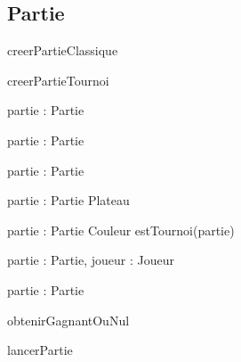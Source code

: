\subsection{Partie}

\begin{algorithme}
  \signatureProcedure
  {creerPartieClassique}
  { }
\end{algorithme}

\begin{algorithme}
  \signatureProcedure
  {creerPartieTournoi}
  { }
\end{algorithme}

\begin{algorithme}
    {partie : Partie}
    {\booleen}
\end{algorithme}

\begin{algorithme}
    {partie : Partie}
    {\naturel}
\end{algorithme}

\begin{algorithme}
    {partie : Partie}
    {}
\end{algorithme}

\begin{algorithme}
    {partie : Partie}
    {Plateau}
\end{algorithme}

\begin{algorithme}
    {partie : Partie}
    {Couleur}
    {estTournoi(partie)}
\end{algorithme}

\begin{algorithme}
    {partie : Partie, joueur : Joueur}
    {\booleen}
\end{algorithme}

\begin{algorithme}
    {partie : Partie}
    {\booleen}
\end{algorithme}

\begin{algorithme}
  \signatureprocedure
  {obtenirGagnantOuNul}
  { }
\end{algorithme}

\begin{algorithme}
	\signatureprocedure
	{lancerPartie}
	{ }
\end{algorithme}
